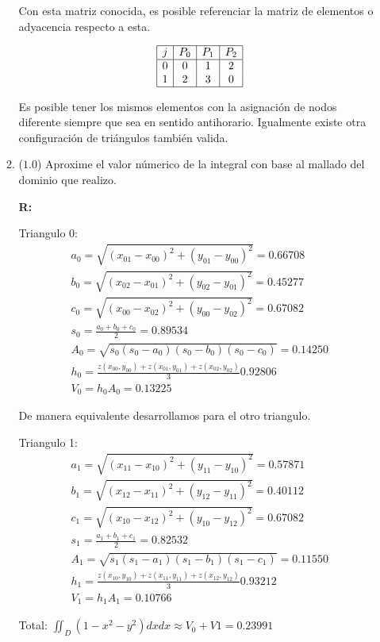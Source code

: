 \documentclass[12pt]{article}
\begin{document}
\begin{enumerate}[leftmargin=*,widest=9]
\begin{enumerate}[label=\alph*]
Con esta matriz conocida, es posible referenciar la matriz de elementos o adyacencia respecto a esta.

\[
\begin{array}{|c|c|c|c|}
\hline
j & P_0 & P_1 & P_2 \\
\hline
0 & 0 & 1 & 2\\
1 & 2 & 3 & 0\\
\hline
\end{array}
\]

Es posible tener los mismos elementos con la asignación de nodos diferente siempre que sea en sentido antihorario. Igualmente existe otra configuración de triángulos también valida.

    \item (\(1.0\)) Aproxime el valor númerico de la integral con base al mallado del dominio que realizo.

	  \textbf{R:}

Triangulo 0:
\begin{eqnarray*}
a_0 = \sqrt{(x_{01} - x_{00})^2 + (y_{01}-y_{00})^2} = 0.66708\\
b_0 = \sqrt{(x_{02} - x_{01})^2 + (y_{02}-y_{01})^2} = 0.45277\\
c_0 = \sqrt{(x_{00} - x_{02})^2 + (y_{00}-y_{02})^2} = 0.67082\\
s_0 = \frac{a_0+b_0+c_0}{2} = 0.89534\\
A_0 = \sqrt{s_0(s_0 - a_0)(s_0-b_0)(s_0-c_0)} = 0.14250\\
h_0 = \frac{z(x_{00},y_{00})+z(x_{01},y_{01})+z(x_{02},y_{02})}{3} 0.92806 \\
V_0 = h_0 A_0 = 0.13225
\end{eqnarray*}

De manera equivalente desarrollamos para el otro triangulo.

Triangulo 1:
\begin{eqnarray*}
a_1 = \sqrt{(x_{11} - x_{10})^2 + (y_{11}-y_{10})^2} = 0.57871\\
b_1 = \sqrt{(x_{12} - x_{11})^2 + (y_{12}-y_{11})^2} = 0.40112\\
c_1 = \sqrt{(x_{10} - x_{12})^2 + (y_{10}-y_{12})^2} = 0.67082\\
s_1 = \frac{a_1+b_1+c_1}{2} = 0.82532\\
A_1 = \sqrt{s_1(s_1 - a_1)(s_1-b_1)(s_1-c_1)} = 0.11550\\
h_1 = \frac{z(x_{10},y_{10})+z(x_{11},y_{11})+z(x_{12},y_{12})}{3} 0.93212 \\
V_1 = h_1 A_1 = 0.10766
\end{eqnarray*}

Total: \(\iint_D (1-x^2-y^2)dxdx \approx V_0 + V1 = 0.23991\)

    \end{enumerate}

\end{enumerate}
\end{document}

